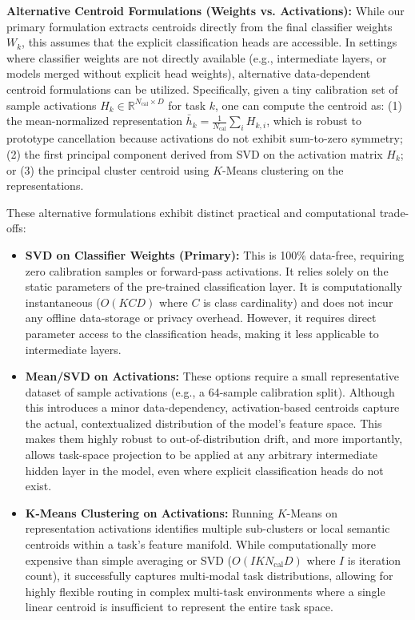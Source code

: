 \textbf{Alternative Centroid Formulations (Weights vs. Activations):} While our primary formulation extracts centroids directly from the final classifier weights $W_k$, this assumes that the explicit classification heads are accessible. In settings where classifier weights are not directly available (e.g., intermediate layers, or models merged without explicit head weights), alternative data-dependent centroid formulations can be utilized. Specifically, given a tiny calibration set of sample activations $H_k \in \mathbb{R}^{N_{\text{cal}} \times D}$ for task $k$, one can compute the centroid as: (1) the mean-normalized representation $\bar{h}_k = \frac{1}{N_{\text{cal}}} \sum_{i} H_{k, i}$, which is robust to prototype cancellation because activations do not exhibit sum-to-zero symmetry; (2) the first principal component derived from SVD on the activation matrix $H_k$; or (3) the principal cluster centroid using $K$-Means clustering on the representations.

These alternative formulations exhibit distinct practical and computational trade-offs:
\begin{itemize}
    \item \textbf{SVD on Classifier Weights (Primary):} This is 100\% data-free, requiring zero calibration samples or forward-pass activations. It relies solely on the static parameters of the pre-trained classification layer. It is computationally instantaneous ($O(K C D)$ where $C$ is class cardinality) and does not incur any offline data-storage or privacy overhead. However, it requires direct parameter access to the classification heads, making it less applicable to intermediate layers.
    \item \textbf{Mean/SVD on Activations:} These options require a small representative dataset of sample activations (e.g., a 64-sample calibration split). Although this introduces a minor data-dependency, activation-based centroids capture the actual, contextualized distribution of the model's feature space. This makes them highly robust to out-of-distribution drift, and more importantly, allows task-space projection to be applied at any arbitrary intermediate hidden layer in the model, even where explicit classification heads do not exist.
    \item \textbf{K-Means Clustering on Activations:} Running $K$-Means on representation activations identifies multiple sub-clusters or local semantic centroids within a task's feature manifold. While computationally more expensive than simple averaging or SVD ($O(I K N_{\text{cal}} D)$ where $I$ is iteration count), it successfully captures multi-modal task distributions, allowing for highly flexible routing in complex multi-task environments where a single linear centroid is insufficient to represent the entire task space.
\end{itemize}


